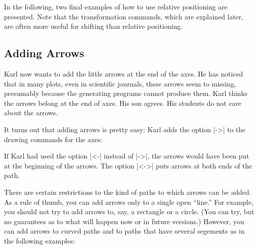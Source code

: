 In the following, two final examples of how to use relative
positioning are presented. Note that the transformation commands,
which are explained later, are often more useful for shifting than
relative positioning. 

\begin{codeexample}[]
\end{codeexample}



\subsection{Adding Arrows}

Karl now wants to add the little arrows at the end of the axes. He has
noticed that in many plots, even in scientific journals, these arrows
seem to missing, presumably because the generating programs cannot
produce them. Karl thinks the arrows belong at the end of axes. His
son agrees. His students do not care about the arrows.

It turns out that adding arrows is pretty easy: Karl adds the option
|->| to the drawing commands for the axes:

\begin{codeexample}[]
\end{codeexample}

If Karl had used the option |<-| instead of |->|, the arrows would
have been put at the beginning of the arrows. The option |<->| puts
arrows at both ends of the path.

There are certain restrictions to the kind of paths to which arrows
can be added. As a rule of thumb, you can add arrows only to a single
open ``line.'' For example, you should not try to add arrows to, say,
a rectangle or a circle. (You can try, but no guarantees as to what
will happen now or in future versions.) However, you can add arrows to
curved paths and to paths that have several segements as in the
following examples:

